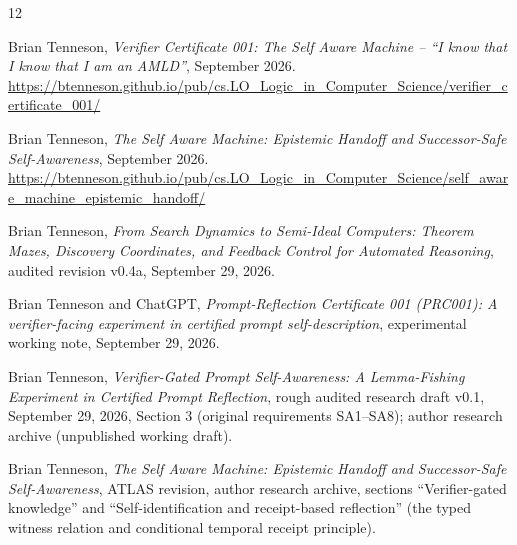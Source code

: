 \documentclass[11pt]{article}
\theoremstyle{remark}
\begin{document}
\begin{thebibliography}{12}

Brian Tenneson,
\emph{Verifier Certificate 001: The Self Aware Machine -- ``I know that I know that I am an AMLD''},
September 2026.\\
\url{https://btenneson.github.io/pub/cs.LO_Logic_in_Computer_Science/verifier_certificate_001/}

Brian Tenneson,
\emph{The Self Aware Machine: Epistemic Handoff and Successor-Safe Self-Awareness},
September 2026.\\
\url{https://btenneson.github.io/pub/cs.LO_Logic_in_Computer_Science/self_aware_machine_epistemic_handoff/}

Brian Tenneson,
\emph{From Search Dynamics to Semi-Ideal Computers: Theorem Mazes, Discovery Coordinates, and Feedback Control for Automated Reasoning},
audited revision v0.4a, September 29, 2026.

Brian Tenneson and ChatGPT,
\emph{Prompt-Reflection Certificate 001 (PRC001): A verifier-facing experiment in certified prompt self-description},
experimental working note, September 29, 2026.

Brian Tenneson,
\emph{Verifier-Gated Prompt Self-Awareness: A Lemma-Fishing Experiment in Certified Prompt Reflection},
rough audited research draft v0.1, September 29, 2026,
Section 3 (original requirements SA1--SA8); author research archive
(unpublished working draft).

Brian Tenneson,
\emph{The Self Aware Machine: Epistemic Handoff and Successor-Safe Self-Awareness},
ATLAS revision, author research archive, sections ``Verifier-gated knowledge''
and ``Self-identification and receipt-based reflection'' (the typed witness
relation and conditional temporal receipt principle).

\end{thebibliography}
\end{document}
